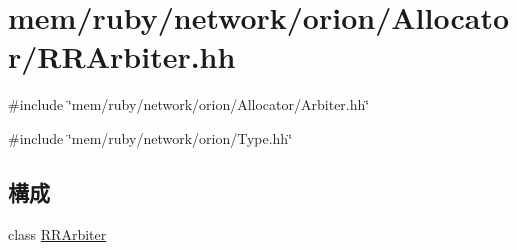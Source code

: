 \hypertarget{RRArbiter_8hh}{
\section{mem/ruby/network/orion/Allocator/RRArbiter.hh}
\label{RRArbiter_8hh}
}
{\ttfamily \#include \char`\"{}mem/ruby/network/orion/Allocator/Arbiter.hh\char`\"{}}\par
{\ttfamily \#include \char`\"{}mem/ruby/network/orion/Type.hh\char`\"{}}\par
\subsection*{構成}
\begin{DoxyCompactItemize}
\item 
class \hyperlink{classRRArbiter}{RRArbiter}
\end{DoxyCompactItemize}
